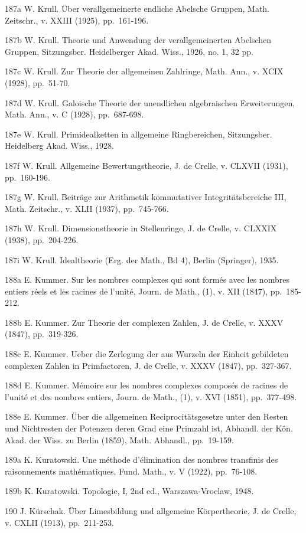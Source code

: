 187a W. Krull. Über verallgemeinerte endliche Abelsche Gruppen, Math. Zeitschr., v. XXIII (1925), pp.~161-196.

187b W. Krull. Theorie und Anwendung der verallgemeinerten Abelschen Gruppen, Sitzungsber. Heidelberger Akad. Wiss., 1926, no. 1, 32 pp.

187c W. Krull. Zur Theorie der allgemeinen Zahlringe, Math. Ann., v. XCIX (1928), pp.~51-70.

187d W. Krull. Galoische Theorie der unendlichen algebraischen Erweiterungen, Math. Ann., v. C (1928), pp.~687-698.

187e W. Krull. Primidealketten in allgemeine Ringbereichen, Sitzungsber. Heidelberg Akad. Wiss., 1928.

187f W. Krull. Allgemeine Bewertungstheorie, J. de Crelle, v. CLXVII (1931), pp.~160-196.

187g W. Krull. Beiträge zur Arithmetik kommutativer Integritätsbereiche III, Math. Zeitschr., v. XLII (1937), pp.~745-766.

187h W. Krull. Dimensionstheorie in Stellenringe, J. de Crelle, v. CLXXIX (1938), pp.~204-226.

187i W. Krull. Idealtheorie (Erg. der Math., Bd 4), Berlin (Springer), 1935.

188a E. Kummer. Sur les nombres complexes qui sont formés avec les nombres entiers réels et les racines de l'unité, Journ. de Math., (1), v. XII (1847), pp.~185-212.

188b E. Kummer. Zur Theorie der complexen Zahlen, J. de Crelle, v. XXXV (1847), pp.~319-326.

188c E. Kummer. Ueber die Zerlegung der aus Wurzeln der Einheit gebildeten complexen Zahlen in Primfactoren, J. de Crelle, v. XXXV (1847), pp.~327-367.

188d E. Kummer. Mémoire sur les nombres complexes composés de racines de l'unité et des nombres entiers, Journ. de Math., (1), v. XVI (1851), pp.~377-498.

188e E. Kummer. Über die allgemeinen Reciprocitätsgesetze unter den Resten und Nichtresten der Potenzen deren Grad eine Primzahl ist, Abhandl. der Kön. Akad. der Wiss. zu Berlin (1859), Math. Abhandl., pp.~19-159.

189a K. Kuratowski. Une méthode d'élimination des nombres transfinis des raisonnements mathématiques, Fund. Math., v. V (1922), pp.~76-108.

189b K. Kuratowski. Topologie, I, 2nd ed., Warszawa-Vroclaw, 1948.

190 J. Kürschak. Über Limesbildung und allgemeine Körpertheorie, J. de Crelle, v. CXLII (1913), pp.~211-253.

